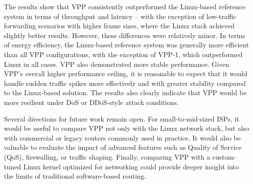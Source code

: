 The results show that VPP consistently outperformed the Linux-based reference system in terms of throughput and latency -- with the exception of low-traffic forwarding scenarios with higher frame sizes, 
where the Linux stack achieved slightly better results. 
However, these differences were relatively minor. 
In terms of energy efficiency, the Linux-based reference system was generally more efficient than all VPP configurations, with the exception of VPP-1, which outperformed Linux in all cases.
VPP also demonstrated more stable performance.
Given VPP’s overall higher performance ceiling, it is reasonable to expect that it would handle sudden traffic spikes more effectively and with greater stability compared to the Linux-based solution. 
The results also clearly indicate that VPP would be more resilient under DoS or DDoS-style attack conditions.


Several directions for future work remain open. For small-to-mid-sized ISPs, it would be useful to compare VPP not only with the Linux network stack, but 
also with commercial or legacy routers commonly used in practice. 
It would also be valuable to evaluate the impact of advanced features such as Quality of Service (QoS), firewalling, or traffic shaping. 
Finally, comparing VPP with a custom-tuned Linux kernel optimized for networking could provide deeper insight into the limits of traditional software-based routing.
